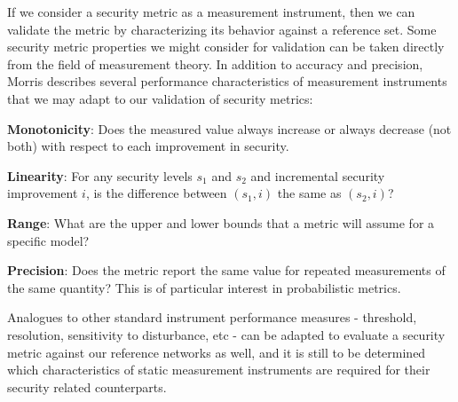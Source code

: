 
If we consider a security metric as a measurement instrument, then we can validate the metric by characterizing its behavior against a reference set. Some security metric properties we might consider for validation can be taken directly from the field of measurement theory. In addition to accuracy and precision, Morris\cite{Morris_2001} describes several performance characteristics of measurement instruments that we may adapt to our validation of security metrics:

\textbf{Monotonicity}: Does the measured value always increase or always decrease (not both) with respect to each improvement in security.

\textbf{Linearity}: For any security levels $s_1$ and $s_2$ and incremental security improvement $i$, is the difference between $(s_1,i)$ the same as $(s_2,i)$?

\textbf{Range}: What are the upper and lower bounds that a metric will assume for a specific model?

\textbf{Precision}: Does the metric report the same value for repeated measurements of the same quantity? This is of particular interest in probabilistic metrics. 

Analogues to other standard instrument performance measures - threshold, resolution, sensitivity to disturbance, etc - can be adapted to evaluate a security metric against our reference networks as well, and it is still to be determined which characteristics of static measurement instruments are required for their security related counterparts. 
